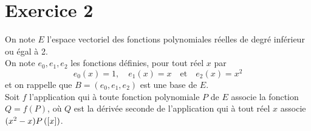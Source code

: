 \documentclass[11pt]{article}%
\begin{document}
\section*{Exercice 2}

On note $E$ l'espace vectoriel des fonctions polynomiales réelles de
degré inférieur ou égal à 2. \\
On note $e_{0},e_{1},e_{2}$ les fonctions définies, pour tout réel $x$
par 
\[
e_{0}(x) = 1,\quad e_{1}(x) = x\quad \text{et}\quad e_{2}(x) = x^{2}
\]
et on rappelle que $B = (e_{0},e_{1},e_{2})$ est une base de $E$.\\
Soit $f$ l'application qui à toute fonction polynomiale $P$ de $E$
associe
la fonction $Q = f(P)$, où $Q$ est la dérivée seconde de l'application
qui à
tout réel $x$ associe $(x^{2}-x)P\left(\left[ {x} \right]\right)$.
\end{document}
